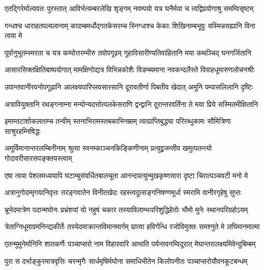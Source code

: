 \fourlineindentedshloka
{एतद्गिरेर्माल्यवतः पुरस्तात्}
{आविर्भत्यम्बरलेखि शृङ्गम्}
{नवम्पयो यत्र घनैर्मया च}
{त्वद्विप्रयोगाश्रु समम्विसृष्टम्} %

\fourlineindentedshloka
{गन्धश्च धाराहतपल्वलानाम्}
{कादम्बमर्धोद्गतकेसरम्च}
{स्निग्धाश्च केकाः शिखिनाम्बभूवुः}
{यस्मिन्नसह्यानि विना त्वया मे} %

\fourlineindentedshloka
{पूर्वानुभूतम्स्मरता च यत्र}
{कम्पोत्तरम्भीरु तवोपगूढम्}
{गुहाविसारीण्यतिवाहितानि}
{मया कथञ्चिद् घनगर्जितानि} %

\fourlineindentedshloka
{आसारसिक्तक्षितिबाष्पयोगात्}
{मामक्षिणोद्यत्र विभिन्नकोशैः}
{विडम्ब्यमाना नवकन्दलैस्ते}
{विवाहधूमारुणलोचनश्रीः} %

\fourlineindentedshloka
{उपान्तवानीरवनोपगूढानि}
{आलक्ष्यपारिप्लवसारसानि}
{दूरावतीर्णा पिबतीव खेदात्}
{अमूनि पम्पासलिलानि दृष्टिः} %

\fourlineindentedshloka
{अत्रावियुक्तानि रथङ्गनाम्ना}
{मन्योन्यदत्तोत्पलकेसराणि}
{द्वन्द्वानि दूरान्तरवर्तिना ते}
{मया प्रिये सस्मितमीक्षितानि} %

\fourlineindentedshloka
{इमाम्तटाशोकलताम्च तन्वीम्}
{स्तनाभिरामस्तबकाभिनम्राम्}
{त्वत्प्राप्तिबुद्ध्या परिरब्धुकामः}
{सौमित्रिणा साश्रुरहम्निषिद्धः} %

\fourlineindentedshloka
{अमूर्विमानान्तरलम्बिनीनाम्}
{श्रुत्वा स्वनम्काञ्चनकिङ्किणीनाम्}
{प्रत्युद्व्रजन्तीव खमुत्पतन्त्यो}
{गोदावरीसारसपङ्क्तयस्त्वाम्} %

\fourlineindentedshloka
{एषा त्वया पेशलमध्ययापि}
{घटाम्बुसंवर्धितबालचूता}
{आनन्दयत्युन्मुखकृष्णसारा}
{दृष्टा चिरात्पञ्चवटी मनो मे} %

\fourlineindentedshloka
{अत्रानुगोदम्मृगयानिवृत्तः}
{तरङ्गवातेन विनीतखेदः}
{रहस्त्वदुत्सङ्गनिषण्णमूर्धा}
{स्मरामि वानीरगृहेषु सुप्तः} %

\fourlineindentedshloka
{भ्रूभेदमात्रेण पदान्मघोनः}
{प्रभ्रंशयां यो नहुषं चकार}
{तस्याविलाम्भःपरिशुद्धिहेतोः}
{भौमो मुनेः स्थानपरिग्रहोऽयम्} %

\fourlineindentedshloka
{त्रेताग्निधूमाग्रमनिन्द्यकीर्तेः}
{तस्येदमाक्रान्तविमानमार्गम्}
{घ्रात्वा हविर्गन्धि रजोविमुक्तः}
{समश्नुते मे लघिमानमात्मा} %

\fourlineindentedshloka
{एतन्मुमुनेर्मानिनि शातकर्णेः}
{पञ्चाप्सरो नाम विहारवारि}
{आभाति पर्यन्तवनम्विदूरात्}
{मेघान्तरालक्ष्यमिवेन्दुबिम्बम्} %

\fourlineindentedshloka
{पुरा स दर्भाङ्कुरमात्रवृत्तिः}
{चरन्मृगैः सार्धमृषिर्मघोना}
{समाधिभीतेन किलोपनीतः}
{पञ्चाप्सरोयौवनकूटबन्धम्} %

